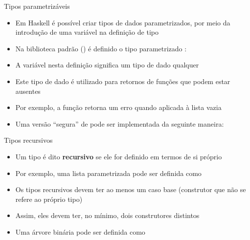 \begin{frame}[fragile]{Tipos parametrizáveis}

    \begin{itemize}
        \item Em Haskell é possível criar tipos de dados parametrizados, por meio da introdução
            de uma variável na definição de tipo

        \item Na biblioteca padrão () é definido o tipo parametrizado
            :


        \item A variável  nesta definição significa um tipo de dado qualquer

        \item Este tipo de dado é utilizado para retornos de funções que podem estar ausentes

        \item Por exemplo, a função  retorna um erro quando aplicada à
            lista vazia


        \item Uma versão ``segura'' de  pode ser implementada da seguinte
            maneira:

    \end{itemize}

\end{frame}

\begin{frame}[fragile]{Tipos recursivos}

    \begin{itemize}
        \item Um tipo é dito \textbf{recursivo} se ele for definido em termos de si próprio

        \item Por exemplo, uma lista parametrizada pode ser definida como


        \item Os tipos recursivos devem ter ao menos um caso base (construtor que não se refere
            ao próprio tipo)

        \item Assim, eles devem ter, no mínimo, dois construtores distintos

        \item Uma árvore binária pode ser definida como

    \end{itemize}

\end{frame}

